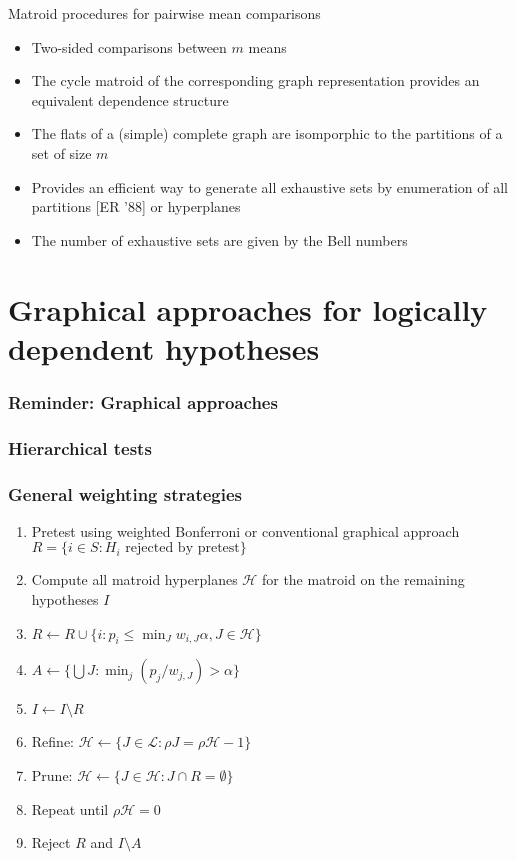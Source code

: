 \documentclass[bigger]{beamer}
\begin{document}
\begin{frame}{Matroid procedures for pairwise mean comparisons}

  \begin{itemize}
  \item Two-sided comparisons between $m$ means
  \item The cycle matroid of the corresponding graph representation
    provides an equivalent dependence structure
  \item The flats of a (simple) complete graph are
    isomporphic to the partitions of a set of size $m$
  \item Provides an efficient way to generate all exhaustive sets by
    enumeration of all partitions [ER '88] or hyperplanes 
  \item The number of exhaustive sets are given by the Bell numbers
    
  \end{itemize}
  
\end{frame}

\section{Graphical approaches for logically dependent hypotheses}



\begin{frame}
\frametitle{Reminder: Graphical approaches}
\end{frame}



\begin{frame}
\frametitle{Hierarchical tests}
\end{frame}



\begin{frame}
\frametitle{General weighting strategies}

\begin{enumerate}
\item Pretest using weighted Bonferroni or conventional graphical
  approach $R = \{i \in S: H_i \textrm{ rejected by pretest}\}$
\item Compute all matroid hyperplanes $\mathscr{H}$ for the matroid on
  the remaining hypotheses $I$
\item $R \gets R \cup \{i: p_i \leq \min_J w_{i,J} \alpha, J \in \mathscr{H}\}$
\item $A \gets \{\bigcup J: \min_j (p_j / w_{j,J}) > \alpha\}$ 
\item $I \gets I \setminus R$
\item Refine: $\mathscr{H} \gets \{J\in \mathscr{L}: \rho J = \rho
  \mathscr{H} - 1\}$ 
\item Prune: $\mathscr{H} \gets \{J \in \mathscr{H}: J \cap R = \emptyset\}$
\item Repeat until $\rho \mathscr {H} = 0$
\item Reject $R$ and $I \setminus A$
\end{enumerate}
\end{frame}
\end{document}
